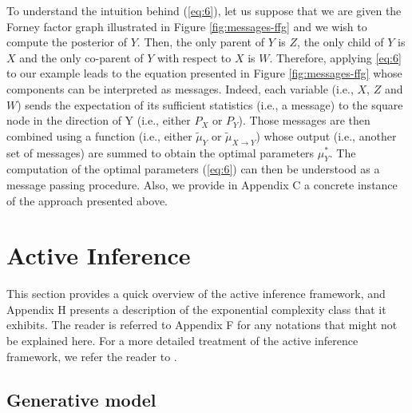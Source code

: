 \documentclass[twoside,11pt]{article}
\begin{document}
To understand the intuition behind (\ref{eq:6}), let us suppose that we are given the Forney factor graph illustrated in Figure \ref{fig:messages-ffg} and we wish to compute the posterior of $Y$. Then, the only parent of $Y$ is $Z$, the only child of $Y$ is $X$ and the only co-parent of $Y$ with respect to $X$ is $W$. Therefore, applying \eqref{eq:6} to our example leads to the equation presented in Figure \ref{fig:messages-ffg} whose components can be interpreted as messages. Indeed, each variable (i.e., $X$, $Z$ and $W$) sends the expectation of its sufficient statistics (i.e., a message) to the square node in the direction of Y (i.e., either $P_X$ or $P_Y$). Those messages are then combined using a function (i.e., either $\tilde{\mu}_{Y}$ or $\tilde{\mu}_{X \rightarrow Y}$) whose output (i.e., another set of messages) are summed to obtain the optimal parameters $\mu_Y^*$. The computation of the optimal parameters (\ref{eq:6}) can then be understood as a message passing procedure. Also, we provide in Appendix C a concrete instance of the approach presented above.

\section{Active Inference}\label{sec:ai}

This section provides a quick overview of the active inference framework, and Appendix H presents a description of the exponential complexity class that it exhibits. The reader is referred to Appendix F for any notations that might not be explained here. For a more detailed treatment of the active inference framework, we refer the reader to \citep{AI_VMP,AI_TUTO,TUTO_AI_RYAN}.

\subsection{Generative model} \label{ssec:GM}
\end{document}
